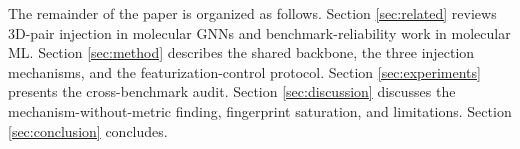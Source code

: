 The remainder of the paper is organized as follows. Section
\ref{sec:related} reviews 3D-pair injection in molecular GNNs and
benchmark-reliability work in molecular ML. Section \ref{sec:method}
describes the shared backbone, the three injection mechanisms, and the
featurization-control protocol. Section \ref{sec:experiments} presents
the cross-benchmark audit. Section \ref{sec:discussion} discusses the
mechanism-without-metric finding, fingerprint saturation, and
limitations. Section \ref{sec:conclusion} concludes.
